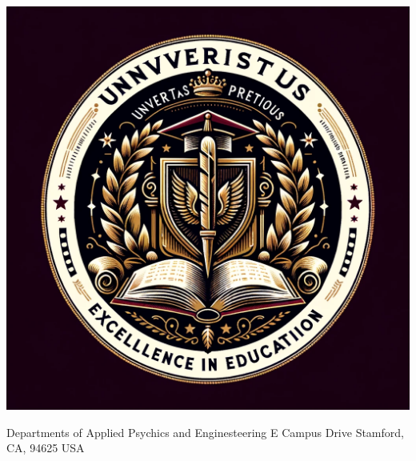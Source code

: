 \documentclass[11pt]{article}
\newcommand{\mybullet}{\textbullet\hspace{0.5em}}
\begin{document}
\noindent
\begin{minipage}[t]{0.15\textwidth}
\vspace*{-2.8cm} %
\includegraphics[width=\linewidth]{logos/DALLE_logo.png} %
\end{minipage}
\hfill
\begin{minipage}[t]{0.6\textwidth}
\vspace*{-2.2cm} %
{\color{black} Departments of Applied Psychics and Enginesteering\color{mygray}\small{} E Campus Drive \mybullet Stamford, CA, 94625 \mybullet USA}
\end{minipage}

\vspace{-0cm} %
\end{document}
